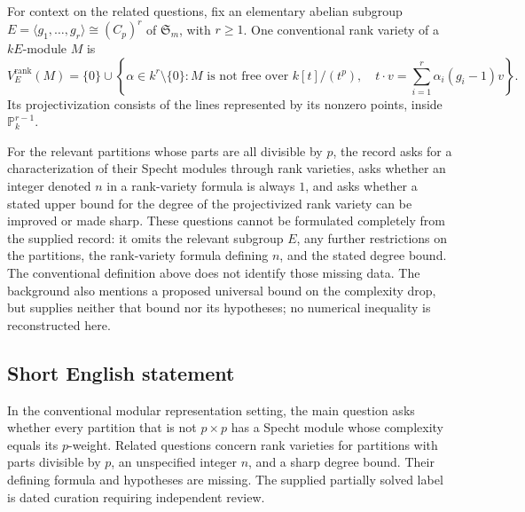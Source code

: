 \documentclass[11pt]{article}
\begin{document}
For context on the related questions, fix an elementary abelian subgroup \(E=\langle g_1,\ldots,g_r\rangle\cong(C_p)^r\) of \(\mathfrak S_m\), with \(r\geq1\). One conventional rank variety of a \(kE\)-module \(M\) is
\[
V_E^{\mathrm{rank}}(M)=\{0\}\cup\left\{\alpha\in k^r\setminus\{0\}:M\text{ is not free over }k[t]/(t^p),\quad t\cdot v=\sum_{i=1}^r\alpha_i(g_i-1)v\right\}.
\]
Its projectivization consists of the lines represented by its nonzero points, inside \(\mathbb P^{r-1}_k\).

For the relevant partitions whose parts are all divisible by \(p\), the record asks for a characterization of their Specht modules through rank varieties, asks whether an integer denoted \(n\) in a rank-variety formula is always \(1\), and asks whether a stated upper bound for the degree of the projectivized rank variety can be improved or made sharp. These questions cannot be formulated completely from the supplied record: it omits the relevant subgroup \(E\), any further restrictions on the partitions, the rank-variety formula defining \(n\), and the stated degree bound. The conventional definition above does not identify those missing data. The background also mentions a proposed universal bound on the complexity drop, but supplies neither that bound nor its hypotheses; no numerical inequality is reconstructed here.
\subsection{Short English statement}
In the conventional modular representation setting, the main question asks whether every partition that is not \(p\times p\) has a Specht module whose complexity equals its \(p\)-weight. Related questions concern rank varieties for partitions with parts divisible by \(p\), an unspecified integer \(n\), and a sharp degree bound. Their defining formula and hypotheses are missing. The supplied partially solved label is dated curation requiring independent review.
\end{document}
